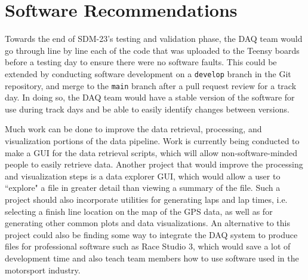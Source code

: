 \section{Software Recommendations}
Towards the end of SDM-23's testing and validation phase, the DAQ team would go through line by line each of the code that was uploaded to the Teensy boards before a testing day to ensure there were no software faults.
This could be extended by conducting software development on a \texttt{develop} branch in the Git repository, and merge to the \texttt{main} branch after a pull request review for a track day.
In doing so, the DAQ team would have a stable version of the software for use during track days and be able to easily identify changes between versions.
\vspace{1em}

Much work can be done to improve the data retrieval, processing, and visualization portions of the data pipeline.
Work is currently being conducted to make a GUI for the data retrieval scripts, which will allow non-software-minded people to easily retrieve data.
Another project that would improve the processing and visualization steps is a data explorer GUI, which would allow a user to ``explore" a file in greater detail than viewing a summary of the file.
Such a project should also incorporate utilities for generating laps and lap times, i.e. selecting a finish line location on the map of the GPS data, as well as for generating other common plots and data visualizations.
An alternative to this project could also be finding some way to integrate the DAQ system to produce files for professional software such as Race Studio 3, which would save a lot of development time and also teach team members how to use software used in the motorsport industry.